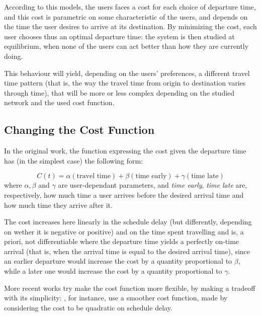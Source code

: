 According to this models, the users faces a cost for each choice of departure time,
and this cost is parametric on some characteristic of the users,
and depends on the time the user desires to arrive at its destination.
By minimizing the cost, each user chooses thus an optimal departure time:
the system is then studied at equilibrium, when none of the users can act better than how they are currently doing.

This behaviour will yield, depending on the users' preferences,
a different travel time pattern (that is, the way the travel time from origin to destination varies through time),
that will be more or less complex depending on the studied network and the used cost function.

\subsection{Changing the Cost Function}

In the original work, the function expressing the cost given the departure time has (in the simplest case) the following form:

\begin{equation}
  \label{eq:cost_intro}
  C(t) = \alpha(\text{travel time}) + \beta (\text{time early}) + \gamma (\text{time late})
\end{equation}
where \(\alpha, \beta\) and \(\gamma\) are user-dependant parameters, and \textit{time early}, \textit{time late} are, respectively, how much time a user arrives before the desired arrival time and how much time they arrive after it.

The cost increases here linearly in the schedule delay (but differently, depending on wether it is negative or positive) and on the time spent travelling and is, a priori, not differentiable where the departure time yields a perfectly on-time arrival
(that is, when the arrival time is equal to the desired arrival time),
since an earlier departure would increase the cost by a quantity proportional to \(\beta\),
while a later one would increase the cost by a quantity proportional to \(\gamma\).

More recent works try make the cost function more flexible,
by making a tradeoff with its simplicity:
, for instance,
use a smoother cost function, made by considering the cost to be quadratic on schedule delay. 

